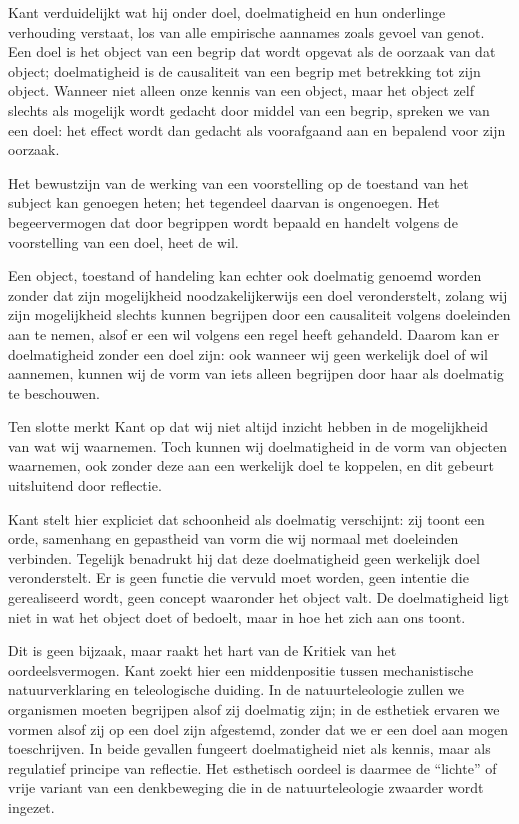 \begin{mdframed}[leftmargin=0pt,rightmargin=0pt,backgroundcolor=blue!6,linecolor=white,innertopmargin=6pt,innerbottommargin=6pt]
Kant verduidelijkt wat hij onder doel, doelmatigheid en hun onderlinge verhouding verstaat, los van alle empirische aannames zoals gevoel van genot. Een doel is het object van een begrip dat wordt opgevat als de oorzaak van dat object; doelmatigheid is de causaliteit van een begrip met betrekking tot zijn object. Wanneer niet alleen onze kennis van een object, maar het object zelf slechts als mogelijk wordt gedacht door middel van een begrip, spreken we van een doel: het effect wordt dan gedacht als voorafgaand aan en bepalend voor zijn oorzaak.

Het bewustzijn van de werking van een voorstelling op de toestand van het subject kan genoegen heten; het tegendeel daarvan is ongenoegen. Het begeervermogen dat door begrippen wordt bepaald en handelt volgens de voorstelling van een doel, heet de wil.

Een object, toestand of handeling kan echter ook doelmatig genoemd worden zonder dat zijn mogelijkheid noodzakelijkerwijs een doel veronderstelt, zolang wij zijn mogelijkheid slechts kunnen begrijpen door een causaliteit volgens doeleinden aan te nemen, alsof er een wil volgens een regel heeft gehandeld. Daarom kan er doelmatigheid zonder een doel zijn: ook wanneer wij geen werkelijk doel of wil aannemen, kunnen wij de vorm van iets alleen begrijpen door haar als doelmatig te beschouwen.

Ten slotte merkt Kant op dat wij niet altijd inzicht hebben in de mogelijkheid van wat wij waarnemen. Toch kunnen wij doelmatigheid in de vorm van objecten waarnemen, ook zonder deze aan een werkelijk doel te koppelen, en dit gebeurt uitsluitend door reflectie.

\bigskip
Kant stelt hier expliciet dat schoonheid als doelmatig verschijnt: zij toont een orde, samenhang en gepastheid van vorm die wij normaal met doeleinden verbinden. Tegelijk benadrukt hij dat deze doelmatigheid geen werkelijk doel veronderstelt. Er is geen functie die vervuld moet worden, geen intentie die gerealiseerd wordt, geen concept waaronder het object valt. De doelmatigheid ligt niet in wat het object doet of bedoelt, maar in hoe het zich aan ons toont.

Dit is geen bijzaak, maar raakt het hart van de Kritiek van het oordeelsvermogen. Kant zoekt hier een middenpositie tussen mechanistische natuurverklaring en teleologische duiding. In de natuurteleologie zullen we organismen moeten begrijpen alsof zij doelmatig zijn; in de esthetiek ervaren we vormen alsof zij op een doel zijn afgestemd, zonder dat we er een doel aan mogen toeschrijven. In beide gevallen fungeert doelmatigheid niet als kennis, maar als regulatief principe van reflectie. Het esthetisch oordeel is daarmee de “lichte” of vrije variant van een denkbeweging die in de natuurteleologie zwaarder wordt ingezet.


\end{mdframed}
